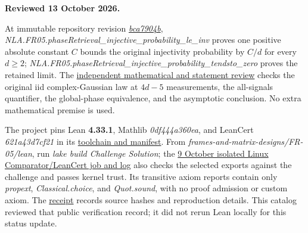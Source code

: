 \documentclass[11pt,a4paper]{article}
\makeatletter
\renewcommand{\subsection}{\Needspace{4\baselineskip}\@startsection{subsection}{2}{0pt}{9pt plus 1pt minus 1pt}{3pt}{\sffamily\bfseries\normalsize\color{ink}}}
\makeatother
\begin{document}
\textbf{Reviewed 13 October 2026.}

At immutable repository revision
\href{https://github.com/ajt60gaibb/OpenProblemsInNLA/blob/bca7904b8d6f43b7258bc0eaed636a2b6b4a8792/frames-and-matrix-designs/FR-05/lean/Solution.lean}{\textit{bca7904b}},
\textit{NLA.FR05.phaseRetrieval\_injective\_probability\_le\_inv} proves
one positive absolute constant \(C\) bounds the original injectivity
probability by \(C/d\) for every \(d\ge2\);
\textit{NLA.FR05.phaseRetrieval\_injective\_probability\_tendsto\_zero}
proves the retained limit. The
\href{https://github.com/ajt60gaibb/OpenProblemsInNLA/blob/main/docs/lean/proofs/FR-05/INDEPENDENT_REVIEW.md}{independent
mathematical and statement review} checks the original iid
complex-Gaussian law at \(4d-5\) measurements, the all-signals
quantifier, the global-phase equivalence, and the asymptotic conclusion.
No extra mathematical premise is used.

The project pins Lean \textbf{4.33.1}, Mathlib \textit{0df444a360ea},
and LeanCert \textit{621a43d7cf21} in its
\href{https://github.com/ajt60gaibb/OpenProblemsInNLA/blob/main/frames-and-matrix-designs/FR-05/lean/lake-manifest.json}{toolchain
and manifest}. From \textit{frames-and-matrix-designs/FR-05/lean}, run
\textit{lake build Challenge Solution}; the
\href{https://github.com/ajt60gaibb/OpenProblemsInNLA/actions/runs/38000947893/job/114058782811}{9
October isolated Linux Comparator/LeanCert job and log} also checks the
selected exports against the challenge and passes kernel trust. Its
transitive axiom reports contain only \textit{propext},
\textit{Classical.choice}, and \textit{Quot.sound}, with no proof
admission or custom axiom. The
\href{https://github.com/ajt60gaibb/OpenProblemsInNLA/blob/main/docs/lean/proofs/FR-05/LINUX_CI_RECEIPT.md}{receipt}
records source hashes and reproduction details. This catalog reviewed
that public verification record; it did not rerun Lean locally for this
status update.

\subsection{References}\label{references}
\end{document}
